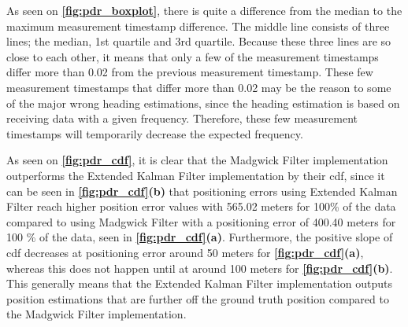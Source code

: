 As seen on \textbf{\autoref{fig:pdr_boxplot}}, there is quite a difference from the median to the maximum measurement timestamp difference. The middle line consists of three lines; the median, 1st quartile and 3rd quartile. Because these three lines are so close to each other, it means that only a few of the measurement timestamps differ more than 0.02 from the previous measurement timestamp. These few measurement timestamps that differ more than 0.02 may be the reason to some of the major wrong heading estimations, since the heading estimation is based on receiving data with a given frequency. Therefore, these few measurement timestamps will temporarily decrease the expected frequency.

As seen on \textbf{\autoref{fig:pdr_cdf}}, it is clear that the Madgwick Filter implementation outperforms the Extended Kalman Filter implementation by their \gls{cdf}, since it can be seen in \textbf{\autoref{fig:pdr_cdf}(b)} that positioning errors using Extended Kalman Filter reach higher position error values with 565.02 meters for 100\% of the data compared to using Madgwick Filter with a positioning error of 400.40 meters for 100 \% of the data, seen in \textbf{\autoref{fig:pdr_cdf}(a)}. Furthermore, the positive slope of \gls{cdf} decreases at positioning error around 50 meters for \textbf{\autoref{fig:pdr_cdf}(a)}, whereas this does not happen until at around 100 meters for \textbf{\autoref{fig:pdr_cdf}(b)}. This generally means that the Extended Kalman Filter implementation outputs position estimations that are further off the ground truth position compared to the Madgwick Filter implementation.

